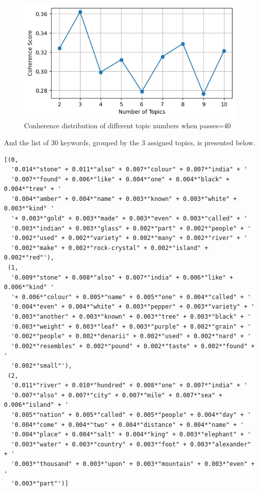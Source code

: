 \documentclass[
  12pt,
]{article}
\begin{document}
\begin{figure}

{\centering \includegraphics{NHthesis_structure_files/figure-pdf/fig-topic_coherence_distribution-output-1.png}

}

\caption{\label{fig-topic_coherence_distribution}Conherence distribution
of different topic numbers when passes=40}

\end{figure}

And the list of 30 keywords, grouped by the 3 assigned topics, is
presented below.

\begin{verbatim}
[(0,
  '0.014*"stone" + 0.011*"also" + 0.007*"colour" + 0.007*"india" + '
  '0.007*"found" + 0.006*"like" + 0.004*"one" + 0.004*"black" + 0.004*"tree" + '
  '0.004*"amber" + 0.004*"name" + 0.003*"known" + 0.003*"white" + 0.003*"kind" '
  '+ 0.003*"gold" + 0.003*"made" + 0.003*"even" + 0.003*"called" + '
  '0.003*"indian" + 0.003*"glass" + 0.002*"part" + 0.002*"people" + '
  '0.002*"used" + 0.002*"variety" + 0.002*"many" + 0.002*"river" + '
  '0.002*"make" + 0.002*"rock-crystal" + 0.002*"island" + 0.002*"red"'),
 (1,
  '0.009*"stone" + 0.008*"also" + 0.007*"india" + 0.006*"like" + 0.006*"kind" '
  '+ 0.006*"colour" + 0.005*"name" + 0.005*"one" + 0.004*"called" + '
  '0.004*"even" + 0.004*"white" + 0.003*"pepper" + 0.003*"variety" + '
  '0.003*"another" + 0.003*"known" + 0.003*"tree" + 0.003*"black" + '
  '0.003*"weight" + 0.003*"leaf" + 0.003*"purple" + 0.002*"grain" + '
  '0.002*"people" + 0.002*"denarii" + 0.002*"used" + 0.002*"nard" + '
  '0.002*"resembles" + 0.002*"pound" + 0.002*"taste" + 0.002*"found" + '
  '0.002*"small"'),
 (2,
  '0.011*"river" + 0.010*"hundred" + 0.008*"one" + 0.007*"india" + '
  '0.007*"also" + 0.007*"city" + 0.007*"mile" + 0.007*"sea" + 0.006*"island" + '
  '0.005*"nation" + 0.005*"called" + 0.005*"people" + 0.004*"day" + '
  '0.004*"come" + 0.004*"two" + 0.004*"distance" + 0.004*"name" + '
  '0.004*"place" + 0.004*"salt" + 0.004*"king" + 0.003*"elephant" + '
  '0.003*"water" + 0.003*"country" + 0.003*"foot" + 0.003*"alexander" + '
  '0.003*"thousand" + 0.003*"upon" + 0.003*"mountain" + 0.003*"even" + '
  '0.003*"part"')]
\end{verbatim}
\end{document}
